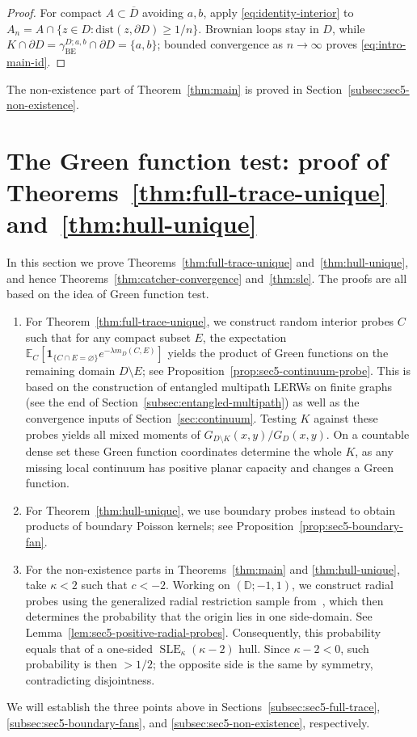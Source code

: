 \documentclass[11pt]{article}
\numberwithin{equation}{section}
\newcommand{\D}{\mathbb{D}}
\newcommand{\E}{\mathbb{E}}
\newcommand{\1}{\mathbf{1}}
\newcommand{\BE}{\mathrm{BE}}
\DeclareMathOperator{\SLE}{SLE}
\newcommand{\dist}{\mathrm{dist}}
\newcommand\ol[1]{\overline{#1}}
\newcommand{\one}{\mathbf 1}
\begin{document}
\begin{proof}
For compact \(A\subset\ol D\) avoiding \(a,b\), apply
\eqref{eq:identity-interior} to
\(A_n=A\cap\{z\in D:\dist(z,\partial D)\geq1/n\}\).
Brownian loops stay in \(D\), while
\(K\cap\partial D=\gamma_{\BE}^{D;a,b}\cap\partial D=\{a,b\}\); bounded convergence as
\(n\to\infty\) proves \eqref{eq:intro-main-id}.
\end{proof}

The non-existence part of Theorem~\ref{thm:main} is proved in
Section~\ref{subsec:sec5-non-existence}.

\section{The Green function test: proof of Theorems~\ref{thm:full-trace-unique} and~\ref{thm:hull-unique}}
\label{sec:sle-proof}


In this section we prove Theorems~\ref{thm:full-trace-unique} and~\ref{thm:hull-unique}, and hence Theorems~\ref{thm:catcher-convergence} and~\ref{thm:sle}.
The proofs are all based on the idea of Green function test.
\begin{enumerate}[label=\textup{(\arabic*)},leftmargin=2.3em]
\item For Theorem~\ref{thm:full-trace-unique},
we construct random interior probes $C$ such that for any compact subset $E$, the expectation $\E_C\!\left[
 \one_{\{C\cap E=\varnothing\}}e^{-\lambda m_D(C,E)}\right]$ yields the product of Green functions on the remaining domain $D\setminus E$; see Proposition~\ref{prop:sec5-continuum-probe}. This is based on the construction of entangled multipath LERWs on finite graphs (see the end of Section~\ref{subsec:entangled-multipath}) as well as the convergence
inputs of Section~\ref{sec:continuum}.
Testing \(K\) against these probes yields all mixed moments of
\(G_{D\setminus K}(x,y)/G_D(x,y)\).  On a countable dense set these Green function coordinates determine the whole \(K\), as any missing local continuum has
positive planar capacity and changes a Green function.

\item For Theorem~\ref{thm:hull-unique}, we use boundary probes instead to obtain products of boundary Poisson kernels; see Proposition~\ref{prop:sec5-boundary-fan}.

\item For the non-existence parts in Theorems~\ref{thm:main} and
\ref{thm:hull-unique}, take \(\kappa<2\) such that $c<-2$. Working on $(\D;-1,1)$, we construct radial probes using the generalized radial restriction sample from~\cite{qian2021generalized}, which then determines the probability that the origin lies in one side-domain. See Lemma~\ref{lem:sec5-positive-radial-probes}. Consequently, this probability equals that of a
one-sided \(\SLE_\kappa(\kappa-2)\) hull.  Since
\(\kappa-2<0\), such probability is then \(>1/2\); the opposite side is the same by symmetry, contradicting disjointness.
\end{enumerate}
We will establish the three points above in Sections~\ref{subsec:sec5-full-trace}, \ref{subsec:sec5-boundary-fans}, and \ref{subsec:sec5-non-existence}, respectively.
\end{document}
